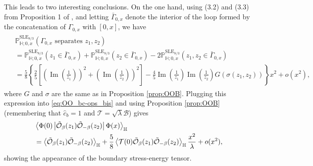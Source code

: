 \documentclass[a4paper,11pt]{article}
\renewcommand{\Im}{\operatorname{Im}}
\begin{document}
This leads to two interesting conclusions. On the one hand, using (3.2) and (3.3) from Proposition 1 of \cite{beliaev2013some}, and letting $\bar\Gamma_{0,x}$ denote the interior of the loop formed by the concatenation of $\Gamma_{0,x}$ with $[0,x]$, we have
\begin{align}
\begin{split}
    & \mathbb{P}^{\text{SLE}_{8/3}}_{\mathbb{H};0,x}(\Gamma_{0,x} \text{ separates } z_1,z_2) \\
    & = \mathbb{P}^{\text{SLE}_{8/3}}_{\mathbb{H};0,x}(z_1 \in {\bar\Gamma_{0,x}}) + \mathbb{P}^{\text{SLE}_{8/3}}_{\mathbb{H};0,x}(z_2 \in {\bar\Gamma_{0,x}}) -2 \mathbb{P}^{\text{SLE}_{8/3}}_{\mathbb{H};0,x}(z_1,z_2 \in {\bar\Gamma_{0,x}}) \\
    & = \frac{5}{8} \left\{ \frac{2}{5} \left[ \left(\Im\left(\frac{1}{z_1}\right)\right)^2 + \left(\Im\left(\frac{1}{z_2}\right)\right)^2 \right] - \frac{4}{5} \Im\left(\frac{1}{z_1}\right) \Im\left(\frac{1}{z_2}\right) G(\sigma(z_1,z_2)) \right\} x^2 + o(x^2),
\end{split}
\end{align}
where $G$ and $\sigma$ are the same as in Proposition \ref{prop:OOB}.
Plugging this expression into \eqref{eq:OO_bc-ops_bis} and using Proposition \ref{prop:OOB} (remembering that $\hat{c}_b=1$ and $\mathcal{T}=\sqrt{\lambda}\mathcal{B}$) gives
\begin{align}
\begin{split} \label{eq:PhiOOPhi}
    & \Braket{\Phi(0) \left\vert \tilde{\mathcal{O}}_{\beta}(z_1) \tilde{\mathcal{O}}_{-\beta}(z_2) \right\vert \Phi(x)}_{\mathbb{H}} \\
    &= \Braket{\tilde{\mathcal{O}}_{\beta}(z_1) \tilde{\mathcal{O}}_{-\beta}(z_2)}_{\mathbb{H}} + \frac{5}{8} \Braket{ \mathcal{T}(0) \tilde{\mathcal{O}}_{\beta}(z_1) \tilde{\mathcal{O}}_{-\beta}(z_2) }_{\mathbb{H}} \frac{x^2}{\lambda} + o(x^2),
\end{split}
\end{align}
showing the appearance of the boundary stress-energy tensor.
\end{document}
